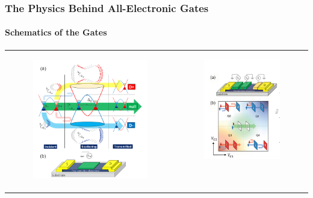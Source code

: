 \documentclass{beamer}
\begin{document}
   \begin{frame}
    \frametitle{The Physics Behind All-Electronic Gates}
   \framesubtitle{Schematics of the Gates}

  \begin{tabular}{cc}
  \begin{figure}
  \includegraphics[scale=0.25]{gate_and_cones.png} 
  \end{figure}&   \begin{figure}
  \includegraphics[scale=0.35]{gate1.png} 
  \end{figure} \
  \end{tabular}
\end{frame}
 
\end{document}
